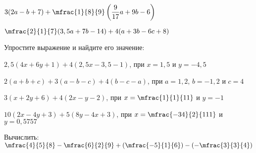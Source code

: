 \begin{class}[number=5]
\begin{listofex}
\begin{enumcols}[itemcolumns=2]
			\item \( 3(2a-b+7)+\mfrac{1}{8}{9}\left( \dfrac{9}{17}a+9b-6 \right) \)
			\item \( \mfrac{2}{1}{7}(3,5a+7b-14)+4(a+3b-6c+8) \)
		\end{enumcols}
		\item Упростите выражение и найдите его значение:
				\begin{enumcols}
				\item \( 2,5(4x+6y+1)+4(2,5x-3,5-1) \), при \( x=1,5 \) и \( y=-4,5 \)
				\item \( 2(a+b+c)+3(a-b-c)+4(b-c-a) \), при \( a=1,2 \), \( b=-1,2 \) и \( c=4 \)
				\item \( 3(x+2y+6)+4(2x-y-2) \), при \( x=\mfrac{1}{1}{11} \) и \( y=-1 \)
				\item \( 10(2x-4y+3)+5(8y-4x+3) \), при \( x=\mfrac{-34}{2}{111} \) и \( y=0,5757 \)
			\end{enumcols}
		\item Вычислить:  \quad
		\( \mfrac{4}{5}{8}-\mfrac{6}{2}{9}+\left( \mfrac{-5}{1}{6} \right)-\left( -\mfrac{3}{3}{4} \right) \)
		\end{listofex}
\end{class}
%
%
